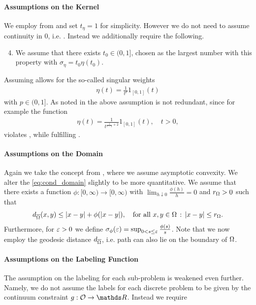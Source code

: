 \paragraph{Assumptions on the Kernel}
%
We employ  from \cite{roith2022continuum} and set $t_\eta =1$ for simplicity. However we do not need to assume continuity in $0$, i.e. . Instead we additionally require the following.
%
\begin{enumerate}[label=(K\upshape\arabic*)]
\setcounter{enumi}{3}
\item\label{ass:kernel} We assume that there exists $t_0\in(0,1]$, chosen as the largest number with this property with $\sigma_\eta=t_0\eta(t_0)$.
\end{enumerate}
%
Assuming  allows for the so-called singular weights
%
\begin{align*}
\eta(t)=\frac{1}{t^p}1_{[0,1]}(t)
\end{align*}
%
with $p\in(0,1]$. As noted in \cite{bungert2021uniform} the above assumption is not redundant, since for example the function
%
\begin{align*}
\eta(t) = \frac{1}{t^{\frac{1}{t-1}+2}}1_{[0,1]}(t),\quad t>0,
\end{align*}
%
violates , while fulfilling .
%
%
\paragraph{Assumptions on the Domain} Again we take the concept from \cite{roith2022continuum}, where we assume asymptotic convexity. We alter the \cref{eq:cond_domain} slightly to be more quantitative. We assume that there exists a function $\phi:[0,\infty)\to[0,\infty)$ with $\lim_{h\downarrow 0}\frac{\phi(h)}{h} = 0$ and $r_\Omega>0$ such that 
\begin{equation}\label{eq:geodesic_euclidean}
d_{\overline{\Omega}}(x,y) \leq |x-y| + \phi(\left|x-y\right|), \quad \text{for all }x,y\in\Omega\,:\, |x-y|\leq r_\Omega.
\end{equation}
%
Furthermore, for $\varepsilon>0$ we define $\sigma_\phi(\varepsilon) = \sup_{0 < s \leq \varepsilon}\frac{\phi(s)}{s}$. Note that we now employ the geodesic distance $d_{\overline{\Omega}}$, i.e. path can also lie on the boundary of $\Omega$.
%
%
\paragraph{Assumptions on the Labeling Function} The assumption on the labeling for each sub-problem is weakened even further. Namely, we do not assume the labels for each discrete problem to be given by the continuum constraint $g:\conset\to\R$. Instead we require 

